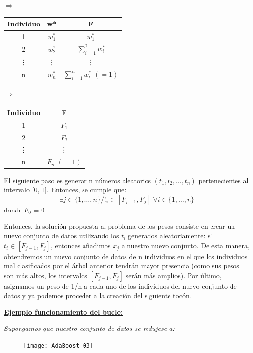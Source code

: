 \documentclass[12pt,twoside]{article}
\begin{document}
\begin{center}
$\Rightarrow$
\begin{tabular}{|c|c|c|}
\hline
Individuo & w* & F\\ \hline
1 & $w_1^*$ & $w_1^*$ \\ \hline
2 & $w_2^*$ & $\displaystyle \sum_{i=1}^2 w_i^*$ \\ \hline
\vdots & \vdots & \vdots \\ \hline
n & $w_n^*$ & $\displaystyle \sum_{i=1}^n w_i^* \, \, (= 1)$ \\ \hline
\end{tabular}
$\Rightarrow$
\begin{tabular}{|c|c|}
\hline
Individuo & F \\ \hline
1 & $F_1$ \\ \hline
2 & $F_2$ \\ \hline
\vdots & \vdots \\ \hline
n & $F_n \, \, (=1)$ \\ \hline
\end{tabular}
\end{center}

El siguiente paso es generar n números aleatorios $(t_1, t_2, \dots, t_n)$ pertenecientes al intervalo [0, 1]. Entonces, se cumple que:
\begin{equation*}
\exists j \in \{1, \dots, n \} /t_i \in [F_{j-1}, F_{j}] \, \, \forall i \in \{1, \dots, n \}
\end{equation*}
donde $F_0$ = 0.

Entonces, la solución propuesta al problema de los pesos consiste en crear un nuevo conjunto de datos utilizando los $t_i$ generados aleatoriamente: si $t_i \in [F_{j-1}, F_{j}]$, entonces añadimos $x_j$ a nuestro nuevo conjunto. De esta manera, obtendremos un nuevo conjunto de datos de n individuos en el que los individuos mal clasificados por el árbol anterior tendrán mayor presencia (como sus pesos son más altos, los intervalos $[F_{j-1}, F_{j}]$ serán más amplios). Por último, asignamos un peso de 1/n a cada uno de los individuos del nuevo conjunto de datos y ya podemos proceder a la creación del siguiente tocón.

\bigskip \bigskip \bigskip \bigskip \bigskip

\textbf{\underline{Ejemplo funcionamiento del bucle:}}

\textit{Supongamos que nuestro conjunto de datos se redujese a:}
\begin{figure}[h]
\centering
\texttt{[image: AdaBoost\_03]}
\end{figure}
\end{document}
